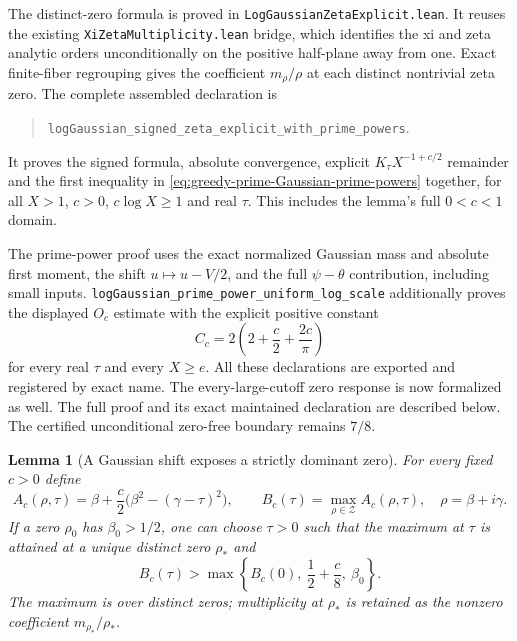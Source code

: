 \documentclass[11pt]{article}
\newtheorem{lemma}[theorem]{Lemma}
\theoremstyle{definition}
\begin{document}
The distinct-zero formula is proved in
\texttt{LogGaussian\allowbreak ZetaExplicit.lean}. It reuses the existing
\texttt{XiZetaMultiplicity.lean} bridge, which identifies the xi and
zeta analytic orders unconditionally on the positive half-plane away
from one. Exact finite-fiber regrouping gives the coefficient
$m_\rho/\rho$ at each distinct nontrivial zeta zero.
The complete assembled declaration is
\begin{quote}
\texttt{logGaussian\_signed\_zeta\_explicit\_\allowbreak with\_prime\_powers}.
\end{quote}
It proves the signed formula, absolute convergence, explicit
$K_\tau X^{-1+c/2}$ remainder and the first inequality in
\eqref{eq:greedy-prime-Gaussian-prime-powers} together, for all
$X>1$, $c>0$, $c\log X\ge1$ and real $\tau$.
This includes the lemma's full $0<c<1$ domain.

The prime-power proof uses the exact normalized Gaussian mass and
absolute first moment, the shift $u\mapsto u-V/2$, and the full
$\psi-\theta$ contribution, including small inputs.
\texttt{logGaussian\_prime\_power\_uniform\_log\_scale} additionally
proves the displayed $O_c$ estimate with the explicit positive constant
\[
 C_c=2\left(2+\frac c2+\frac{2c}{\pi}\right)
\]
for every real $\tau$ and every $X\ge e$.
All these declarations are exported and registered by exact name.
The every-large-cutoff zero response is now formalized as well.
The full proof and its exact maintained declaration are described below.
The certified unconditional zero-free boundary remains $7/8$.

\begin{lemma}[A Gaussian shift exposes a strictly dominant zero]
\label{lem:greedy-prime-Gaussian-exposure}
For every fixed $c>0$ define
\begin{equation}
 A_c(\rho,\tau)
   =\beta+\frac c2\bigl(\beta^2-(\gamma-\tau)^2\bigr),
 \qquad
 B_c(\tau)=\max_{\rho\in\mathcal Z}A_c(\rho,\tau),
 \quad \rho=\beta+i\gamma.
 \label{eq:greedy-prime-Gaussian-exponents}
\end{equation}
If a zero $\rho_0$ has $\beta_0>1/2$, one can choose $\tau>0$
such that the maximum at $\tau$ is attained at a unique distinct zero
$\rho_*$ and
\begin{equation}
 B_c(\tau)>
   \max\left\{B_c(0),\ \frac12+\frac c8,\ \beta_0\right\}.
 \label{eq:greedy-prime-Gaussian-gap}
\end{equation}
The maximum is over distinct zeros; multiplicity at $\rho_*$
is retained as the nonzero coefficient $m_{\rho_*}/\rho_*$.
\end{lemma}
\end{document}
